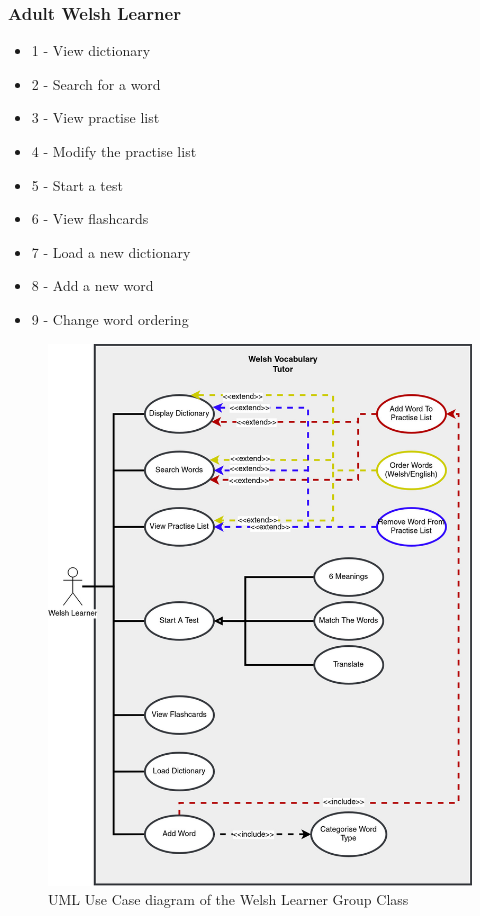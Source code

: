 \documentclass{project}
\begin{document}
\subsubsection{Adult Welsh Learner}
\begin{itemize}
	\item 1 - View dictionary
	\item 2 - Search for a word
	\item 3 - View practise list
	\item 4 - Modify the practise list
	\item 5 - Start a test
	\item 6 - View flashcards
	\item 7 - Load a new dictionary
	\item 8 - Add a new word
	\item 9 - Change word ordering
\end{itemize}
\begin{figure}[h]
\includegraphics[width=\textwidth]{UCD}
\centering
	\caption{UML Use Case diagram of the Welsh Learner Group Class}
        \label{figure:1}
\end{figure}
\clearpage
\end{document}
